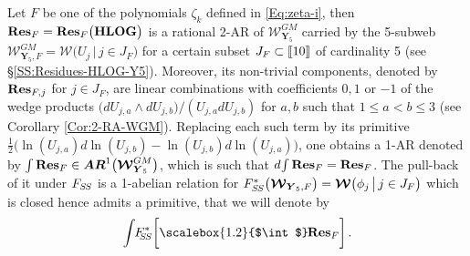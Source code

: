\documentclass[11pt]{amsart}
\begin{document}
Let $F$ be one of the polynomials $\zeta_k$ defined in \eqref{Eq:zeta-i}, then 
${\bf Res}_F={\bf Res}_F\big( {\bf HLOG}\big) $ is a rational 2-AR of $\boldsymbol{\mathcal W}_{\boldsymbol{Y}_5}^{GM}$ carried by the 5-subweb $\boldsymbol{\mathcal W}_{\boldsymbol{Y}_5,F}^{GM}=\boldsymbol{\mathcal W}\big( U_j\, \big\lvert \, j \in J_F\big)$ for a certain subset $J_F\subset  [\hspace{-0.05cm}[  10 ]\hspace{-0.05cm}]$ 
of cardinality 5 (see \S\ref{SS:Residues-HLOG-Y5}). Moreover, its non-trivial components, denoted by 
${\bf Res}_{F,j} $ for 
$j\in J_F$, 
are linear combinations with coefficients $0,1$ or $-1$ of the wedge products 
$\big(dU_{j,a}\wedge dU_{j,b}\big)/(U_{j,a} dU_{j,b})$ for $a,b$ such that $1\leq a<b \leq 3$ (see Corollary 
\ref{Cor:2-RA-WGM}).  Replacing each such term by its primitive 
$\frac12 \big( \ln(U_{j,a}) d\ln(U_{j,b})-\ln(U_{j,b}) d\ln(U_{j,a})\big)$, 
one obtains a 1-AR denoted by $\int  {\bf Res}_F\in \boldsymbol{AR}^1\big( \boldsymbol{\mathcal W}_{\boldsymbol{Y}_5}^{GM} \big) $, which is such that $d \hspace{-0.05cm}\int  {\bf Res}_F= {\bf Res}_F$. The pull-back of it under $F_{S\hspace{-0.03cm}S}$ 
is a  1-abelian relation for $F_{S\hspace{-0.03cm}S}^*\big( \boldsymbol{\mathcal W}_{\boldsymbol{Y}_5,F}\big)=\boldsymbol{\mathcal W}\big( \phi_j\, \big\lvert \, j \in J_F\big)$ which is closed hence admits a primitive, that we will denote by 
$$
\int 
\hspace{-0.09cm} 
F_{\hspace{-0.05cm} 
\hspace{-0.04cm}
S\hspace{-0.03cm}S}^*\bigg[ 
\hspace{-0.0cm}
\scalebox{1.2}{$\int$}  \hspace{-0.03cm} {\bf Res}_F\bigg]\,.
$$
\end{document}
